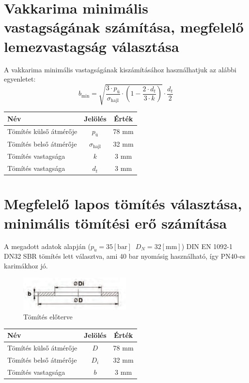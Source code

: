 \documentclass[10pt, a4paper]{article}
\newcommand{\baar}{\mathrm{\left[bar\right]}}
\newcommand{\mm}{\mathrm{\left[mm\right]}}
\begin{document}
	\section{Vakkarima minimális vastagságának számítása, megfelelő lemezvastagság választása}
	A vakkarima minimális vastagságának kiszámításához használhatjuk az alábbi egyenletet:\\
	\begin{equation}
		b_{\text{min}} = \sqrt{\dfrac{3 \cdot p_\text{ü}}{\sigma_{\text{hajl}}} \cdot \left(1 - \dfrac{2 \cdot d_t}{3 \cdot k}\right)} \cdot \dfrac{d_t}{2}
	\end{equation}
	\renewcommand{\arraystretch}{1.4}
		\begin{table}[h]
			\centering
			\begin{tabular}{l|c|c}
				\textbf{Név}                              & \textbf{Jelölés} & \textbf{Érték} \\ \hline
				Tömítés külső átmérője                     & $p_\text{ü}$                & 78 mm           \\
				Tömítés belső átmérője                     & $\sigma_{\text{hajl}}$                & 32 mm			\\
				Tömítés vastagsága                         & $k$                & 3 mm     \\
				Tömítés vastagsága                         & $d_t$                & 3 mm           
			\end{tabular}
		\end{table}
		\renewcommand{\arraystretch}{1}	
	\section{Megfelelő lapos tömítés választása, minimális tömítési erő számítása}
	A megadott adatok alapján ($p_{\ddot{u}} = 35\baar\;\;D_N = 32\mm$) DIN EN 1092-1 DN32 SBR tömítés lett választva, ami 40 bar nyomásig használható, így PN40-es karimákhoz jó.
	\begin{figure}[h]
		\centering
		\includegraphics[width=0.5\textwidth]{ tomites_eloterv.png }
		\caption{Tömítés előterve}
		\label{fig:tomites}
	\end{figure}
	\renewcommand{\arraystretch}{1.4}
	\begin{table}[h]
		\centering
		\begin{tabular}{l|c|c}
			\textbf{Név}                              & \textbf{Jelölés} & \textbf{Érték} \\ \hline
			Tömítés külső átmérője                     & $D$                & 78 mm           \\
			Tömítés belső átmérője                     & $D_i$                & 32 mm			\\
			Tömítés vastagsága                         & $b$                & 3 mm             
		\end{tabular}
	\end{table}
	\renewcommand{\arraystretch}{1}	
\end{document}
